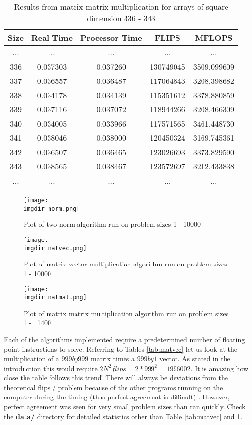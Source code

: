 \documentclass[a4paper,12pt]{article}
\def \imgdir {../img/}
\begin{document}
\begin{table}[!ht]
  \centering
  \caption{Results from matrix matrix multiplication for arrays of square dimension 336 - 343}
  \label{tab:matmat}

  \vspace{3mm}
  \begin{tabular}{ c c c c c }
    Size & Real Time & Processor Time & FLIPS & MFLOPS \\ \hline
    ... & ... & ... & ... & ... \\
    336 & 0.037303 & 0.037260 & 130749045 & 3509.099609 \\
    337 & 0.036557 & 0.036487 & 117064843 & 3208.398682 \\
    338 & 0.034178 & 0.034139 & 115351612 & 3378.880859 \\
    339 & 0.037116 & 0.037072 & 118944266 & 3208.466309 \\
    340 & 0.034005 & 0.033966 & 117571565 & 3461.448730 \\
    341 & 0.038046 & 0.038000 & 120450324 & 3169.745361 \\
    342 & 0.036507 & 0.036465 & 123026693 & 3373.829590 \\
    343 & 0.038565 & 0.038467 & 123572697 & 3212.433838 \\
    ... & ... & ... & ... & ... 
  \end{tabular}
\end{table}

\begin{figure}[!ht]
  \centering
  \texttt{[image: \\imgdir norm.png]}
  \caption{Plot of two norm algorithm run on problem sizes 1 - 10000}
  \label{fig:2-norm}
\end{figure}

\begin{figure}[!ht]
  \centering
  \texttt{[image: \\imgdir matvec.png]}
  \caption{Plot of matrix vector multiplication algorithm run on problem sizes 1 - 10000}
  \label{fig:matvec}
\end{figure}

\begin{figure}[!ht]
  \centering
  \texttt{[image: \\imgdir matmat.png]}
  \caption{Plot of matrix matrix multiplication algorithm run on problem sizes 1 - ~1400}
  \label{fig:matmat}
\end{figure}

Each of the algorithms implemented require a predetermined number of floating point instructions to solve. Referring to Tables \ref{tab:matvec} let us look at the multiplication of a $999 by 999$ matrix times a $999 by 1$ vector. As stated in the introduction this would require $2N^{2} flips = 2 * 999 ^{2} = 1996002$. It is amazing how close the table follows this trend! There will always be deviations from the theoretical flips / problem because of the other programs running on the computer during the timing (thus perfect agreement is difficult) . However, perfect agreement was seen for very small problem sizes than ran quickly. Check the \textbf{data/} directory for detailed statistics other than Table \ref{tab:matvec} and \ref{tab:matmat}.
\end{document}
